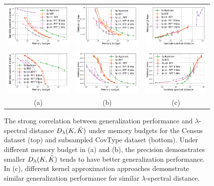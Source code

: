 \begin{figure}
	\centering
	\begin{tabular}{c c c}
		\includegraphics[width=0.33\linewidth]{figures/regression_delta_vs_mem.pdf} &
		\includegraphics[width=0.33\linewidth]{figures/regression_l2_vs_mem.pdf} &
		\includegraphics[width=0.33\linewidth]{figures/regression_l2_vs_delta.pdf} \\
		\includegraphics[width=0.33\linewidth]{figures/classification_delta_vs_mem.pdf} &
		\includegraphics[width=0.33\linewidth]{figures/classification_acc_vs_mem.pdf} &
		\includegraphics[width=0.33\linewidth]{figures/classification_acc_vs_delta.pdf} \\
		(a) & (b) & (c)
	\end{tabular}
	\caption{The strong correlation between generalization performance and $\lambda$-spectral distance $D_{\lambda}(K,\tilde{K})$ under memory budgets for the Census dataset (top) and subsampled CovType dataset (bottom). Under different memory budget in (a) and (b), the precision demonstrates smaller $D_{\lambda}(K,\tilde{K})$ tends to have better generalization performance. In (c), different kernel approximation approaches demonstrate similar generalization performance for similar $\lambda$-spectral distance.}
	\label{fig:specdist}
\end{figure}

